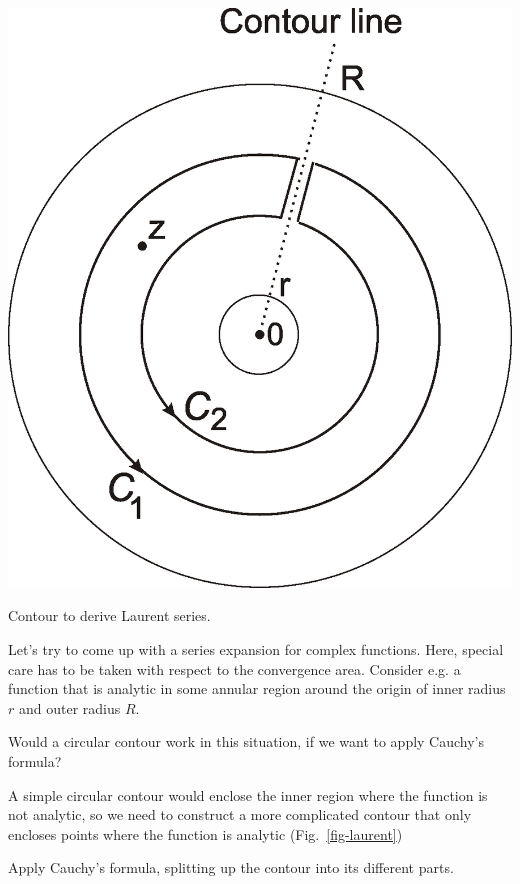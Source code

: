 \begin{marginfigure}
\includegraphics{complex/figures/laurent}
\caption{Contour to derive Laurent series.}
\label{fig-laurent}
\end{marginfigure}

Let's try to come up with a series expansion for complex functions. Here, special care has to be taken with respect to the convergence area. Consider e.g. a function that is analytic in some annular region around the origin of inner radius $r$ and outer radius $R$.

\begin{cue}
Would a circular contour work in this situation, if we want to apply Cauchy's formula?
\end{cue}

A simple circular contour would enclose the inner region where the function is not analytic, so we need to construct a more complicated contour that only encloses points where the function is analytic (Fig.~\ref{fig-laurent})

\begin{cue}
  Apply Cauchy's formula, splitting up the contour into its different parts.
\end{cue}

